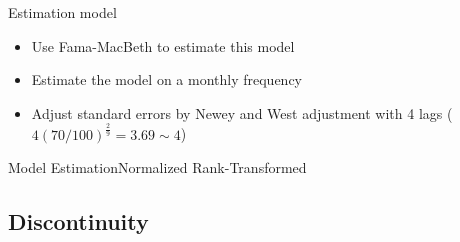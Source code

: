 \documentclass{beamer}
\begin{document}
	
	
	\begin{frame}{Estimation model}
		\begin{itemize}
			\item Use Fama-MacBeth to estimate this model
			
			
			\item Estimate the model on a monthly frequency 
			\item Adjust standard errors by Newey and West adjustment with 4 lags ($ 4(70/100)^{\frac{2}{9}} = 3.69 \sim 4 $)
		\end{itemize}
	\end{frame}
	
	\begin{frame}{Model Estimation}{Normalized Rank-Transformed}
		\label{Monthly15} 
		\begin{table}[htbp]
			\centering
			\resizebox{1\textwidth}{!}{
				
			}
		\end{table}
		
		
	\end{frame}
	
	
	\subsection{Discontinuity}
	
\end{document}
